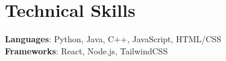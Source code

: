 \documentclass[letterpaper,11pt]{article}
\begin{document}
%
\section{Technical Skills}
\begin{itemize}[leftmargin=0.15in, label={}]
  \small{\item{
        \textbf{Languages}{: Python, Java, C++, JavaScript, HTML/CSS} \\
         \textbf{Frameworks}{: React, Node.js, TailwindCSS} \\
        }}
\end{itemize}

\end{document}
